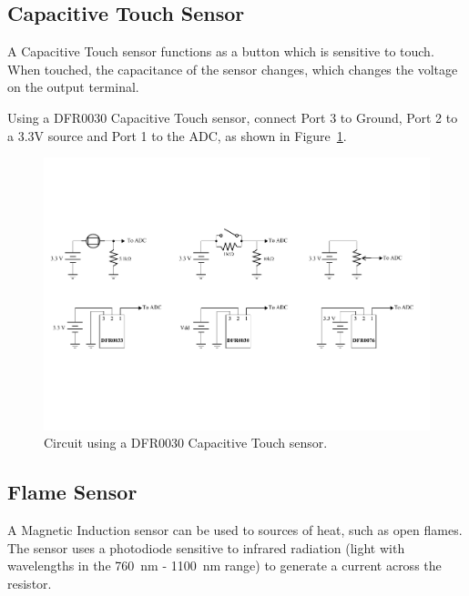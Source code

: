 \documentclass[11pt, twoside, pdftex]{article}
\begin{document}
\pagebreak

\subsection{Capacitive Touch Sensor}
A Capacitive Touch sensor functions as a button which is sensitive to touch. When touched, the capacitance of the sensor changes, which changes the voltage on the output terminal.

Using a {\sf DFR0030} Capacitive Touch sensor, connect Port 3 to Ground, Port 2 to a 3.3V source and Port 1 to the ADC, as shown in Figure~\ref{fig:touch}.
\begin{figure} [H]
\begin{center}
\includegraphics{figures/touch_sensor.pdf}
\end{center}
\caption{Circuit using a DFR0030 Capacitive Touch sensor.}
\label{fig:touch}
\end{figure}

\subsection{Flame Sensor}
A Magnetic Induction sensor can be used to sources of heat, such as open flames. The sensor uses a photodiode sensitive to infrared radiation (light with wavelengths in the 760~nm - 1100~nm range) to generate a current across the resistor. 
\end{document}
